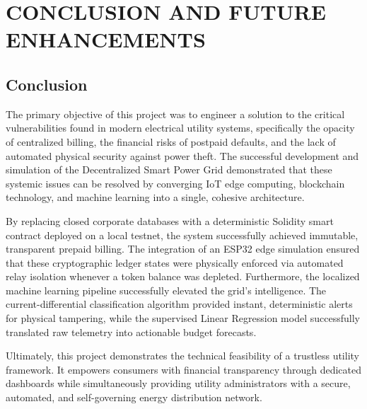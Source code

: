 \chapter{CONCLUSION AND FUTURE ENHANCEMENTS}

\section{Conclusion}
The primary objective of this project was to engineer a solution to the critical vulnerabilities found in modern electrical utility systems, specifically the opacity of centralized billing, the financial risks of postpaid defaults, and the lack of automated physical security against power theft. The successful development and simulation of the Decentralized Smart Power Grid demonstrated that these systemic issues can be resolved by converging IoT edge computing, blockchain technology, and machine learning into a single, cohesive architecture.

By replacing closed corporate databases with a deterministic Solidity smart contract deployed on a local testnet, the system successfully achieved immutable, transparent prepaid billing. The integration of an ESP32 edge simulation ensured that these cryptographic ledger states were physically enforced via automated relay isolation whenever a token balance was depleted. Furthermore, the localized machine learning pipeline successfully elevated the grid's intelligence. The current-differential classification algorithm provided instant, deterministic alerts for physical tampering, while the supervised Linear Regression model successfully translated raw telemetry into actionable budget forecasts.

Ultimately, this project demonstrates the technical feasibility of a trustless utility framework. It empowers consumers with financial transparency through dedicated dashboards while simultaneously providing utility administrators with a secure, automated, and self-governing energy distribution network.


